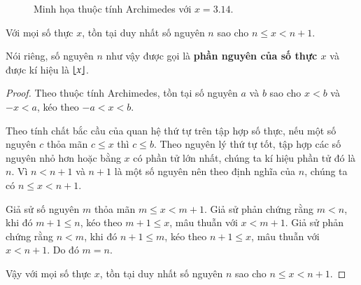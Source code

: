 \begin{figure}[htp]
    \centering
    \caption{Minh họa thuộc tính Archimedes với $x = 3.14$.}
\end{figure}

\begin{theorem}
    Với mọi số thực $x$, tồn tại duy nhất số nguyên $n$ sao cho $n\leq x < n+1$.

    \noindent Nói riêng, số nguyên $n$ như vậy được gọi là \textbf{phần nguyên của số thực $x$} và được kí hiệu là $\left\lfloor{x}\right\rfloor$.
\end{theorem}

\begin{proof}
    Theo thuộc tính Archimedes, tồn tại số nguyên $a$ và $b$ sao cho $x < b$ và $-x < a$, kéo theo $-a < x < b$.

    Theo tính chất bắc cầu của quan hệ thứ tự trên tập hợp số thực, nếu một số nguyên $c$ thỏa mãn $c\leq x$ thì $c\leq b$. Theo nguyên lý thứ tự tốt, tập hợp các số nguyên nhỏ hơn hoặc bằng $x$ có phần tử lớn nhất, chúng ta kí hiệu phần tử đó là $n$. Vì $n < n + 1$ và $n + 1$ là một số nguyên nên theo định nghĩa của $n$, chúng ta có $n\leq x < n + 1$.

    Giả sử số nguyên $m$ thỏa mãn $m\leq x < m + 1$. Giả sử phản chứng rằng $m < n$, khi đó $m + 1\leq n$, kéo theo $m + 1\leq x$, mâu thuẫn với $x < m + 1$. Giả sử phản chứng rằng $n < m$, khi đó $n + 1\leq m$, kéo theo $n + 1\leq x$, mâu thuẫn với $x < n + 1$. Do đó $m = n$.

    Vậy với mọi số thực $x$, tồn tại duy nhất số nguyên $n$ sao cho $n\leq x < n+1$.
\end{proof}

